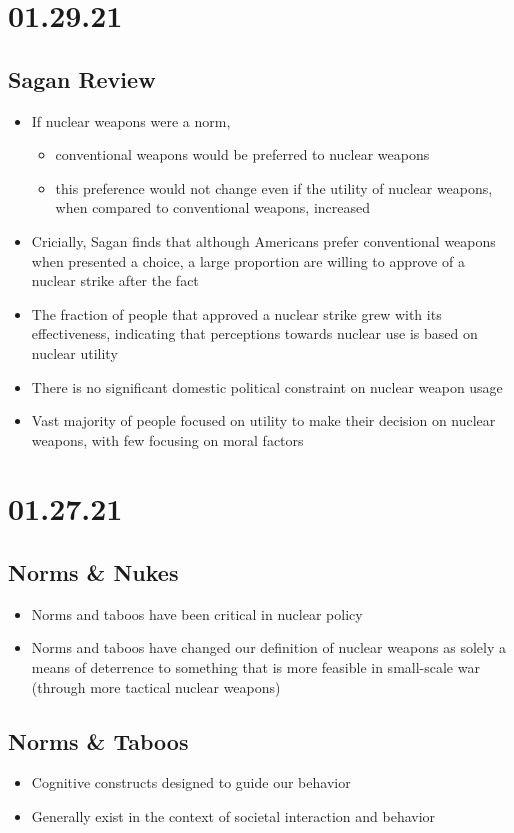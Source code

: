 \documentclass[11pt]{article}
\begin{document}
\section*{01.29.21}
\label{sec:org6ac19fe}
\subsection*{Sagan Review}
\label{sec:org815e6a1}
\begin{itemize}
\item If nuclear weapons were a norm,
\begin{itemize}
\item conventional weapons would be preferred to nuclear weapons
\item this preference would not change even if the utility of nuclear weapons, when compared to conventional weapons, increased
\end{itemize}
\item Cricially, Sagan finds that although Americans prefer conventional weapons when presented a choice, a large proportion are willing to approve of a nuclear strike after the fact
\item The fraction of people that approved a nuclear strike grew with its effectiveness, indicating that perceptions towards nuclear use is based on nuclear utility
\item There is no significant domestic political constraint on nuclear weapon usage
\item Vast majority of people focused on utility to make their decision on nuclear weapons, with few focusing on moral factors
\end{itemize}
\section*{01.27.21}
\label{sec:org47341ee}
\subsection*{Norms \& Nukes}
\label{sec:org1cd70b1}
\begin{itemize}
\item Norms and taboos have been critical in nuclear policy
\item Norms and taboos have changed our definition of nuclear weapons as solely a means of deterrence to something that is more feasible in small-scale war (through more tactical nuclear weapons)
\end{itemize}
\subsection*{Norms \& Taboos}
\label{sec:org60b81bf}
\begin{itemize}
\item Cognitive constructs designed to guide our behavior
\item Generally exist in the context of societal interaction and behavior
\end{itemize}
\end{document}
